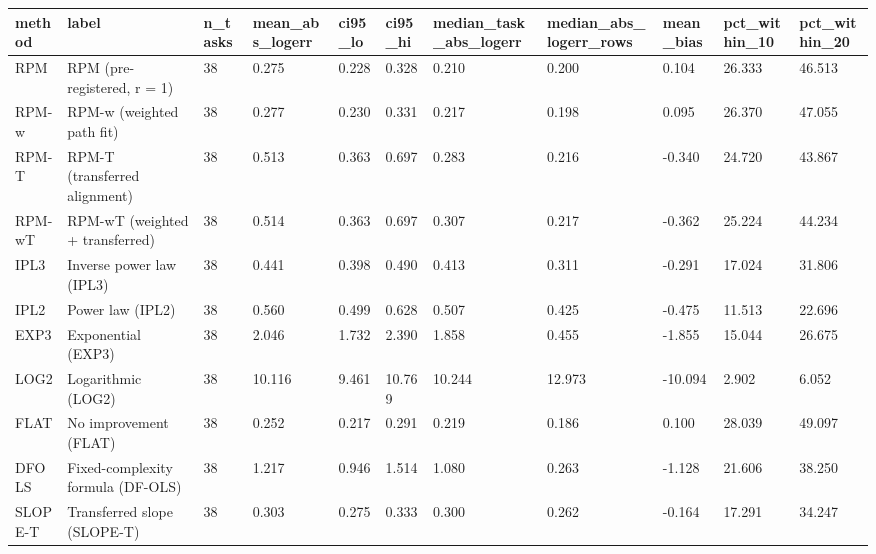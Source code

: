 \begin{tabular}{lllllllllll}
\hline
method & label & n\_tasks & mean\_abs\_logerr & ci95\_lo & ci95\_hi & median\_task\_abs\_logerr & median\_abs\_logerr\_rows & mean\_bias & pct\_within\_10 & pct\_within\_20 \\
\hline
RPM & RPM (pre-registered, r = 1) & 38 & 0.275 & 0.228 & 0.328 & 0.210 & 0.200 & 0.104 & 26.333 & 46.513 \\
RPM-w & RPM-w (weighted path fit) & 38 & 0.277 & 0.230 & 0.331 & 0.217 & 0.198 & 0.095 & 26.370 & 47.055 \\
RPM-T & RPM-T (transferred alignment) & 38 & 0.513 & 0.363 & 0.697 & 0.283 & 0.216 & -0.340 & 24.720 & 43.867 \\
RPM-wT & RPM-wT (weighted + transferred) & 38 & 0.514 & 0.363 & 0.697 & 0.307 & 0.217 & -0.362 & 25.224 & 44.234 \\
IPL3 & Inverse power law (IPL3) & 38 & 0.441 & 0.398 & 0.490 & 0.413 & 0.311 & -0.291 & 17.024 & 31.806 \\
IPL2 & Power law (IPL2) & 38 & 0.560 & 0.499 & 0.628 & 0.507 & 0.425 & -0.475 & 11.513 & 22.696 \\
EXP3 & Exponential (EXP3) & 38 & 2.046 & 1.732 & 2.390 & 1.858 & 0.455 & -1.855 & 15.044 & 26.675 \\
LOG2 & Logarithmic (LOG2) & 38 & 10.116 & 9.461 & 10.769 & 10.244 & 12.973 & -10.094 & 2.902 & 6.052 \\
FLAT & No improvement (FLAT) & 38 & 0.252 & 0.217 & 0.291 & 0.219 & 0.186 & 0.100 & 28.039 & 49.097 \\
DFOLS & Fixed-complexity formula (DF-OLS) & 38 & 1.217 & 0.946 & 1.514 & 1.080 & 0.263 & -1.128 & 21.606 & 38.250 \\
SLOPE-T & Transferred slope (SLOPE-T) & 38 & 0.303 & 0.275 & 0.333 & 0.300 & 0.262 & -0.164 & 17.291 & 34.247 \\
\hline
\end{tabular}

